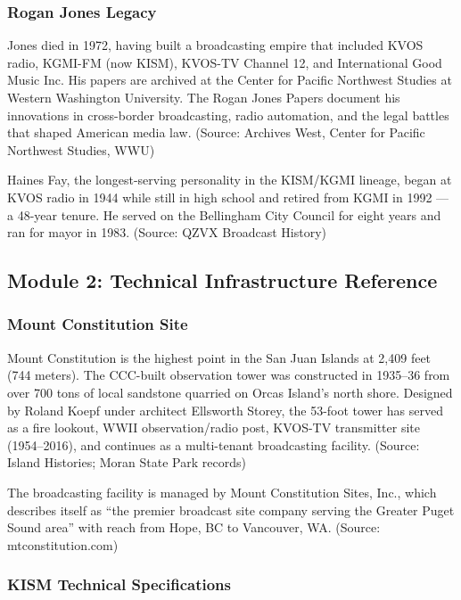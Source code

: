 \documentclass[11pt,letterpaper]{article}
\begin{document}
\subsubsection{Rogan Jones Legacy}

Jones died in 1972, having built a broadcasting empire that included KVOS radio, KGMI-FM (now KISM), KVOS-TV Channel 12, and International Good Music Inc. His papers are archived at the Center for Pacific Northwest Studies at Western Washington University. The Rogan Jones Papers document his innovations in cross-border broadcasting, radio automation, and the legal battles that shaped American media law. (Source: Archives West, Center for Pacific Northwest Studies, WWU)

Haines Fay, the longest-serving personality in the KISM/KGMI lineage, began at KVOS radio in 1944 while still in high school and retired from KGMI in 1992 --- a 48-year tenure. He served on the Bellingham City Council for eight years and ran for mayor in 1983. (Source: QZVX Broadcast History)

\subsection{Module 2: Technical Infrastructure Reference}

\subsubsection{Mount Constitution Site}

Mount Constitution is the highest point in the San Juan Islands at 2,409 feet (744 meters). The CCC-built observation tower was constructed in 1935--36 from over 700 tons of local sandstone quarried on Orcas Island's north shore. Designed by Roland Koepf under architect Ellsworth Storey, the 53-foot tower has served as a fire lookout, WWII observation/radio post, KVOS-TV transmitter site (1954--2016), and continues as a multi-tenant broadcasting facility. (Source: Island Histories; Moran State Park records)

The broadcasting facility is managed by Mount Constitution Sites, Inc., which describes itself as ``the premier broadcast site company serving the Greater Puget Sound area'' with reach from Hope, BC to Vancouver, WA. (Source: mtconstitution.com)

\subsubsection{KISM Technical Specifications}
\end{document}
